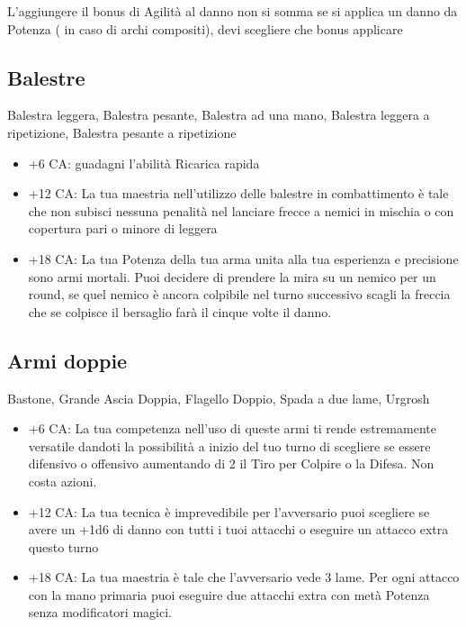 \documentclass[a4paper,11pt,twoside,openany]{book}
\begin{document}
L'aggiungere il bonus di Agilità al danno non si somma se si applica un danno da Potenza ( in caso di archi compositi), devi scegliere che bonus applicare

\subsection{Balestre}Balestra leggera, Balestra pesante, Balestra ad una mano, Balestra leggera a ripetizione, Balestra pesante a ripetizione

\begin{itemize}

\item +6 CA: guadagni l'abilità Ricarica rapida

\item +12 CA: La tua maestria nell'utilizzo delle balestre in combattimento è tale che non subisci nessuna penalità nel lanciare frecce a nemici in mischia o con copertura pari o minore di leggera

\item +18 CA: La tua Potenza della tua arma unita alla tua esperienza e precisione sono armi mortali. Puoi decidere di prendere la mira su un nemico per un round, se quel nemico è ancora colpibile nel turno successivo scagli la freccia che se colpisce il bersaglio farà il cinque volte il danno.

\end{itemize}

\subsection{Armi doppie} Bastone, Grande Ascia Doppia, Flagello Doppio, Spada a due lame, Urgrosh

\begin{itemize}
\item +6 CA: La tua competenza nell'uso di queste armi ti rende estremamente versatile dandoti la possibilità a inizio del tuo turno di scegliere se essere difensivo o offensivo aumentando di 2 il Tiro per Colpire o la Difesa. Non costa azioni.

\item +12 CA: La tua tecnica è imprevedibile per l'avversario puoi scegliere se avere un +1d6 di danno con tutti i tuoi attacchi o eseguire un attacco extra questo turno

\item +18 CA: La tua maestria è tale che l'avversario vede 3 lame. Per ogni attacco con la mano primaria puoi eseguire due attacchi extra con metà Potenza senza modificatori magici.
\end{itemize}
\end{document}
